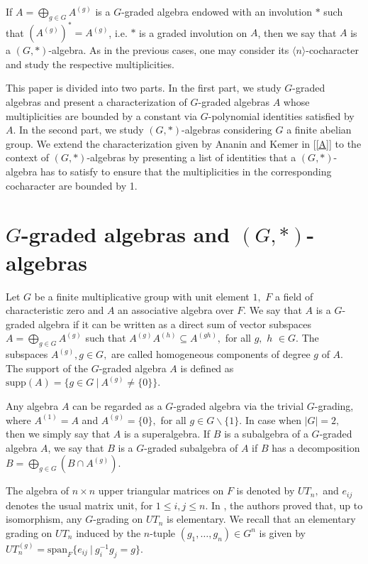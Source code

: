 \documentclass{amsart}
\newcommand{\gen}[1]{\ensuremath{\langle{#1}\rangle}}
\numberwithin{equation}{section}
\begin{document}
If $A=\displaystyle \bigoplus_{g\in G}A^{(g)}$ is a $G$-graded algebra endowed with an involution $\ast$ such that $(A^{(g)})^*=A^{(g)}$, i.e. $\ast$ is a graded involution on $A$, then we say that $A$ is a $(G,\ast)$-algebra. As in the previous cases, one may consider its \gen{n}-cocharacter and study the respective multiplicities.

 This paper is divided into two parts. In the first part, we study $G$-graded algebras and present a characterization of $G$-graded algebras $A$ whose multiplicities are bounded by a constant via $G$-polynomial identities satisfied by $A$. In the second part, we study $(G,\ast)$-algebras considering $G$ a finite abelian group. We extend the characterization given by Ananin and Kemer in [\ref{A}] to the context of $(G,*)$-algebras by presenting a list of identities that a $(G,*)$-algebra has to satisfy to ensure that the multiplicities in the corresponding cocharacter are bounded by 1.
 

\section{$G$-graded algebras and $(G,*)$-algebras}

Let $G$ be a finite multiplicative group with unit element
$1,$  $F$ a field of characteristic zero and $A$
 an associative algebra over $F.$ We say that $A$ is a $G$-graded algebra if it can be written as a direct sum of vector
subspaces $A=\displaystyle\bigoplus\limits_{g\in G}A^{(g)}$
 such that $A^{(g)}A^{(h)}\subseteq  A^{(gh)},$ for all $g,$ $ h $ $\in  G.$ The
subspaces $A^{(g)},g\in G,$ are called homogeneous components of degree $g$ of $A.$ The support of the $G$-graded algebra $A$ is defined as $\mbox{supp}(A) = \{g \in G ~|~A^{(g)}\neq \{0\}\}.$

Any algebra $A$ can be regarded as a $G$-graded algebra via the trivial $G$-grading,
where  $A^{(1)} = A$ and $A^{(g)} = \{0\},$ for all $g \in G\backslash \{1\}.$
In case when $|G|=2,$ then we simply say that $A$ is a superalgebra. 
 If $B$ is a subalgebra of a $G$-graded algebra $A$, we say that $B$ is a $G$-graded subalgebra of $A$ if $B$ has a decomposition $B=\displaystyle\bigoplus\limits_{g \in G}(B\cap A^{(g)}).$

The algebra of $n \times n$ upper triangular matrices on $F$ is denoted by $UT_n,$ and $e_{ij}$ denotes the usual matrix unit, for $1 \le i,j\le n.$ In \cite{VZ}, the authors proved that, up to isomorphism, any $G$-grading on $UT_n$ is elementary.  We recall that an elementary grading on $UT_n$ induced by the $n$-tuple $(g_1,\ldots, g_n)\in G^n$ is given by $UT_n^{(g)}=\mbox{span}_F\{e_{ij} ~|~ g_i^{-1}g_j=g\}$. 
\end{document}
